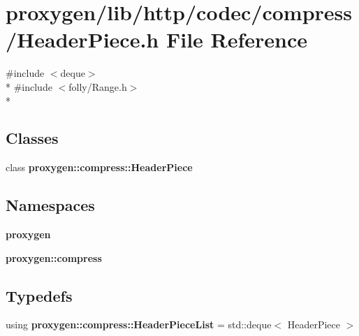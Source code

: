 \section{proxygen/lib/http/codec/compress/\+Header\+Piece.h File Reference}
\label{HeaderPiece_8h}
{\ttfamily \#include $<$deque$>$}\\*
{\ttfamily \#include $<$folly/\+Range.\+h$>$}\\*
\subsection*{Classes}
\begin{DoxyCompactItemize}
\item 
class {\bf proxygen\+::compress\+::\+Header\+Piece}
\end{DoxyCompactItemize}
\subsection*{Namespaces}
\begin{DoxyCompactItemize}
\item 
 {\bf proxygen}
\item 
 {\bf proxygen\+::compress}
\end{DoxyCompactItemize}
\subsection*{Typedefs}
\begin{DoxyCompactItemize}
\item 
using {\bf proxygen\+::compress\+::\+Header\+Piece\+List} = std\+::deque$<$ Header\+Piece $>$
\end{DoxyCompactItemize}
